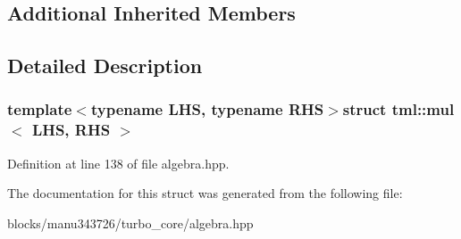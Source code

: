 \subsection*{Additional Inherited Members}


\subsection{Detailed Description}
\subsubsection*{template$<$typename L\+H\+S, typename R\+H\+S$>$struct tml\+::mul$<$ L\+H\+S, R\+H\+S $>$}



Definition at line 138 of file algebra.\+hpp.



The documentation for this struct was generated from the following file\+:\begin{DoxyCompactItemize}
\item 
blocks/manu343726/turbo\+\_\+core/algebra.\+hpp\end{DoxyCompactItemize}
